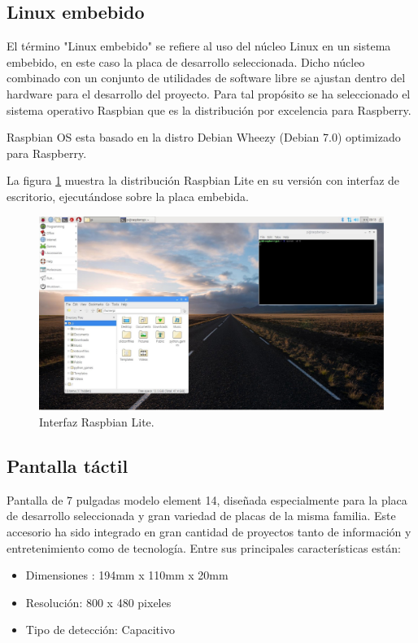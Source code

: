  \subsection{Linux embebido}
El término "Linux embebido" se refiere al uso del núcleo Linux en un sistema embebido, en este caso la placa de desarrollo seleccionada.
Dicho núcleo combinado con un conjunto de utilidades de software libre  se ajustan dentro del hardware para el desarrollo del proyecto.
Para tal propósito se ha seleccionado el sistema operativo Raspbian que es la distribución por excelencia para Raspberry.

Raspbian OS esta basado en la distro Debian Wheezy (Debian 7.0) optimizado para Raspberry.

La figura \ref{fig:raspbian} muestra la distribución Raspbian Lite en su versión con interfaz de escritorio, ejecutándose sobre la placa embebida.

\begin{figure}[H]
	\centering
	\includegraphics[scale=.35]{./Figures/raspbian.pdf}
	\caption{Interfaz Raspbian Lite.}
	\label{fig:raspbian}
\end{figure}

 \subsection{Pantalla táctil}
Pantalla de 7 pulgadas modelo element 14, diseñada especialmente para la placa de desarrollo seleccionada y gran variedad de placas de la misma familia. 
Este accesorio ha sido integrado en gran cantidad de proyectos tanto de información y entretenimiento como de tecnología. 
Entre sus principales características están:

\begin{itemize}
\item Dimensiones : 194mm x 110mm x 20mm 
\item Resolución: 800 x 480 pixeles
\item Tipo de detección: Capacitivo
\end{itemize}

